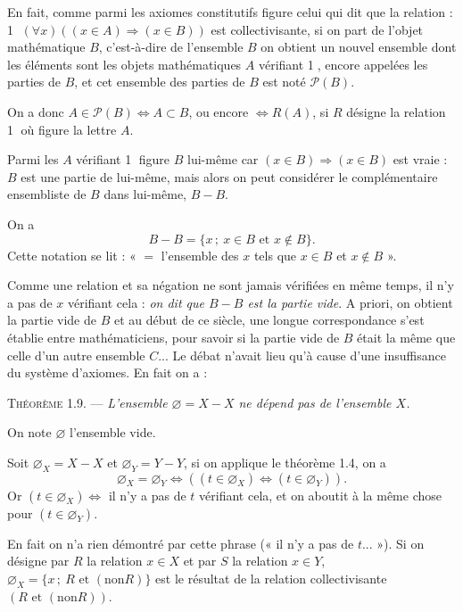 
En fait, comme parmi les axiomes constitutifs figure celui qui dit que la relation : \textcircled{1} $(\forall x)((x\in A)\Rightarrow(x\in B))$ est collectivisante, si on part de l'objet mathématique $B$, c'est-à-dire de l'ensemble $B$ on obtient un nouvel ensemble dont les éléments sont les objets mathématiques $A$ vérifiant \textcircled{1}, encore appelées les parties de $B$, et cet ensemble des parties de $B$ est noté $\mathcal P(B)$.

On a donc $A\in\mathcal P(B)\Leftrightarrow A\subset B$, ou encore $\Leftrightarrow R(A)$, si $R$ désigne la relation \textcircled{1} où figure la lettre $A$.

Parmi les $A$ vérifiant \textcircled{1} figure $B$ lui-même car $(x\in B)\Rightarrow(x\in B)$ est vraie : $B$ est une partie de lui-même, mais alors on peut considérer le complémentaire ensembliste de $B$ dans lui-même, $B-B$.

On a
\[
B-B=\{x\,;\ x\in B\text{ et }x\notin B\}.
\]
Cette notation se lit : « $=$ l'ensemble des $x$ tels que $x\in B$ et $x\notin B$ ».

Comme une relation et sa négation ne sont jamais vérifiées en même temps, il n'y a pas de $x$ vérifiant cela : \emph{on dit que $B-B$ est la partie vide}. A priori, on obtient la partie vide de $B$ et au début de ce siècle, une longue correspondance s'est établie entre mathématiciens, pour savoir si la partie vide de $B$ était la même que celle d'un autre ensemble $C$... Le débat n'avait lieu qu'à cause d'une insuffisance du système d'axiomes. En fait on a :

\medskip\noindent\textsc{Théorème 1.9.} --- \emph{L'ensemble $\varnothing=X-X$ ne dépend pas de l'ensemble $X$.}

On note $\varnothing$ l'ensemble vide.

Soit $\varnothing_X=X-X$ et $\varnothing_Y=Y-Y$, si on applique le théorème 1.4, on a
\[
\varnothing_X=\varnothing_Y\Leftrightarrow((t\in\varnothing_X)\Leftrightarrow(t\in\varnothing_Y)).
\]
Or $(t\in\varnothing_X)\Leftrightarrow$ il n'y a pas de $t$ vérifiant cela, et on aboutit à la même chose pour $(t\in\varnothing_Y)$.

En fait on n'a rien démontré par cette phrase (« il n'y a pas de $t$... »). Si on désigne par $R$ la relation $x\in X$ et par $S$ la relation $x\in Y$, $\varnothing_X=\{x\,;\ R\text{ et }(\text{non}R)\}$ est le résultat de la relation collectivisante $(R\text{ et }(\text{non}R))$.

